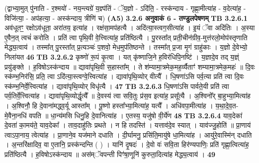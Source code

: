 \documentclass[17pt]{extarticle}
\begin{document}
{{{{{{{{{{{{{{{{{{{                  \newline
                                    (द्वाभ्या॒मुत् पु॑नाति - र॒श्मयो॑ - नय॒न्त्यग्रे॑ य॒ज्ञ्प॑तिं - ॅय॒ज्ञो - ऽदि॑ति॒ - रस्क॑न्दाय - गृह्णा॒मीत्या॑ह - व॒देत्या॑ह॒ - विजि॑त्या॒ - अप॑हत्या॒ - अस्क॑न्दाय॒ त्रीणि॑ च) \textbf{(A5)} \newline \newline
                \textbf{ 3.2.6     अनुवाकं   6 - तण्डुलपेषणम्} \newline
                                \textbf{ TB 3.2.6.1} \newline
                  अव॑धूतꣳ॒॒ रक्षोऽव॑धूता॒ अरा॑तय॒ इत्या॑ह । रक्ष॑सा॒मप॑हत्यै । अदि॑त्या॒स्त्वग॒सीत्या॑ह । इ॒यं ॅवा अदि॑तिः । अ॒स्या ए॒वैन॒त् त्वचं॑ करोति । प्रति॑ त्वा पृथि॒वी वे॒त्त्वित्या॑ह॒ प्रति॑ष्ठित्यै । पु॒रस्ता᳚त् प्रती॒चीन॑ग्रीव॒-मुत्त॑रलो॒मोप॑स्तृणाति मेद्ध्य॒त्वाय॑ । तस्मा᳚त् पु॒रस्ता᳚त् प्र॒त्यञ्चः॑ प॒शवो॒ मेध॒मुप॑तिष्ठन्ते । तस्मा᳚त् प्र॒जा मृ॒गं ग्राहु॑काः । य॒ज्ञो दे॒वेभ्यो॒ निला॑यत \textbf{ 46} \newline
                  \newline
                                \textbf{ TB 3.2.6.2} \newline
                  कृष्णो॑ रू॒पं कृ॒त्वा । यत् कृ॑ष्णाजि॒ने ह॒विर॑धिपि॒नष्टि॑ । य॒ज्ञादे॒व तद् य॒ज्ञ्ं प्रयु॑ङ्क्ते । ह॒विषोऽस्क॑न्दाय ॥ द्यावा॑पृथि॒वी स॒हास्ता᳚म् । ते श॑म्यामा॒त्रमेक॒मह॒र्व्यैताꣳ॑ शम्यामा॒त्रमेक॒महः॑ ॥ दि॒वः स्क॑म्भ॒निर॑सि॒ प्रति॒ त्वा ऽदि॑त्या॒स्त्वग्वे॒त्त्वित्या॑ह । द्यावा॑पृथि॒व्योर् वीत्यै᳚ । धि॒षणा॑ऽसि पर्व॒त्या प्रति॑ त्वा दि॒वः स्क॑म्भ॒निर्वे॒त्त्वित्या॑ह । द्यावा॑पृथि॒व्योर् विधृ॑त्यै । \textbf{ 47} \newline
                  \newline
                                \textbf{ TB 3.2.6.3} \newline
                  धि॒षणा॑ऽसि पार्वते॒यी प्रति॑ त्वा पर्व॒तिर्वे॒त्त्वित्या॑ह । द्यावा॑पृथि॒व्योर्द्धृत्यै᳚ ॥ दे॒वस्य॑ त्वा सवि॒तुः प्र॑स॒व इत्या॑ह॒ प्रसू᳚त्यै । अ॒श्विनो᳚र् बा॒हुभ्या॒मित्या॑ह । अ॒श्विनौ॒ हि दे॒वाना॑मद्ध्व॒र्यू आस्ता᳚म् । पू॒ष्णो हस्ता᳚भ्या॒मित्या॑ह॒ यत्यै᳚ । अधि॑वपा॒मीत्या॑ह । य॒था॒दे॒व॒त-मे॒वैना॒नधि॑ वपति ॥ धा॒न्य॑मसि धिनु॒हि दे॒वानित्या॑ह । ए॒तस्य॒ यजु॑षो वी॒र्ये॑ण \textbf{ 48} \newline
                  \newline
                                \textbf{ TB 3.2.6.4} \newline
                  याव॒देका॑ दे॒वता॑ का॒मय॑ते॒ याव॒देका᳚ । ताव॒दाहु॑तिः प्रथते । न हि तदस्ति॑ । यत्ताव॑दे॒व स्यात् । याव॑ज्जु॒होति॑ ॥ प्रा॒णाय॑ त्वाऽपा॒नाय॒ त्वेत्या॑ह । प्रा॒णाने॒व यज॑माने दधाति । दी॒र्घामनु॒ प्रसि॑ति॒मायु॑षे धा॒मित्या॑ह । आयु॑रे॒वास्मि॑न् दधाति । अ॒न्तरि॑क्षादिव॒ वा ए॒तानि॒ प्रस्क॑न्दन्ति ( ) । यानि॑ दृ॒षदः॑ । दे॒वो वः॑ सवि॒ता हिर॑ण्यपाणिः॒ प्रति॑ गृह्णा॒त्वित्या॑ह॒ प्रति॑ष्ठित्यै । ह॒विषोऽस्क॑न्दाय ॥ अस॑म्ॅवपन्ती पिꣳ॑षा॒णूनि॑ कुरुता॒दित्या॑ह मेद्ध्य॒त्वाय॑ । \textbf{ 49} \newline
}}}}}}}}}}}}}}}}}}}
\end{document}
